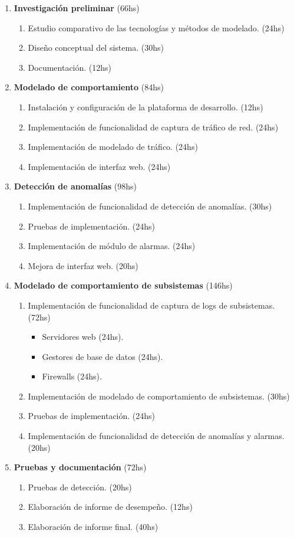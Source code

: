 \begin{enumerate}
	\setlength{\itemsep}{0pt}
	\setlength{\parskip}{0pt}
	\item \textbf{Investigación preliminar} (66hs)
	\begin{enumerate}
		\item Estudio comparativo de las tecnologías y métodos de modelado. (24hs)
		\item Diseño conceptual del sistema. (30hs)
		\item Documentación. (12hs)
	\end{enumerate}
	\item \textbf{Modelado de comportamiento} (84hs)
	\begin{enumerate}
		\item Instalación y configuración de la plataforma de desarrollo. (12hs)
		\item Implementación de funcionalidad de captura de tráfico de red. (24hs)
		\item Implementación de modelado de tráfico. (24hs)
		\item Implementación de interfaz web. (24hs)
	\end{enumerate}
	\item \textbf{Detección de anomalías} (98hs)
	\begin{enumerate}
		\item Implementación de funcionalidad de detección de anomalías. (30hs)
		\item Pruebas de implementación. (24hs)
		\item Implementación de módulo de alarmas. (24hs)
		\item Mejora de interfaz web. (20hs)
	\end{enumerate}
	\item \textbf{Modelado de comportamiento de subsistemas} (146hs)
	\begin{enumerate}
		\item Implementación de funcionalidad de captura de logs de subsistemas. (72hs)
		\begin{itemize}
			\item Servidores web (24hs).
			\item Gestores de base de datos (24hs).
			\item Firewalls (24hs).
		\end{itemize}
		\item Implementación de modelado de comportamiento de subsistemas. (30hs)
		\item Pruebas de implementación. (24hs)
		\item Implementación de funcionalidad de detección de anomalías y alarmas. (20hs)
	\end{enumerate}
	\item \textbf{Pruebas y documentación} (72hs)
	\begin{enumerate}
		\item Pruebas de detección. (20hs)
		\item Elaboración de informe de desempeño. (12hs)
		\item Elaboración de informe final. (40hs)
	\end{enumerate}
\end{enumerate}


